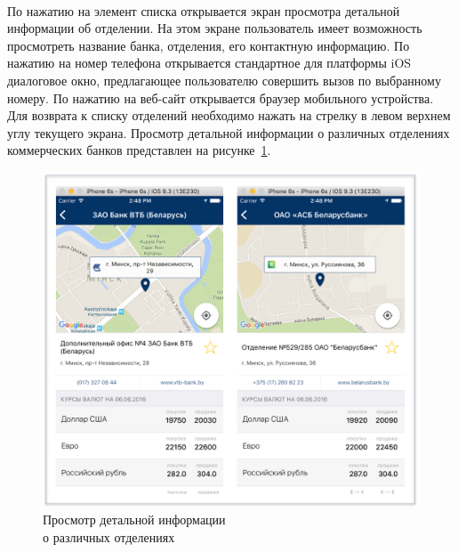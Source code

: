 
\paragraph{}

По нажатию на элемент списка открывается экран просмотра детальной информации
об отделении. На этом экране пользователь имеет возможность просмотреть название
банка, отделения, его контактную информацию. По нажатию на номер телефона
открывается стандартное для платформы iOS диалоговое окно,
предлагающее пользователю совершить вызов по выбранному номеру.
По нажатию на веб-сайт открывается браузер мобильного устройства.
Для возврата к списку отделений необходимо нажать на стрелку в левом верхнем
углу текущего экрана. Просмотр детальной информации о различных отделениях
коммерческих банков представлен на рисунке~\ref{fig:details_manual}.
\begin{figure}[h!]
  \centering
  \includegraphics[width=140mm]{fig/details_manual}
  \caption{Просмотр детальной информации \\ о различных отделениях}
  \label{fig:details_manual}
\end{figure}



\paragraph{}


